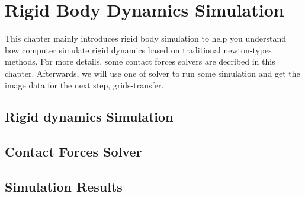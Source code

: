 \chapter{Rigid Body Dynamics Simulation}

This chapter mainly introduces rigid body simulation to help you understand how computer simulate rigid dynamics based on traditional newton-types methods. For more details, some contact forces solvers are decribed in this chapter. Afterwards, we will use one of solver to run some simulation and get the image data for the next step, grids-transfer.

\section{Rigid dynamics Simulation}

\section{Contact Forces Solver}

\section{Simulation Results}